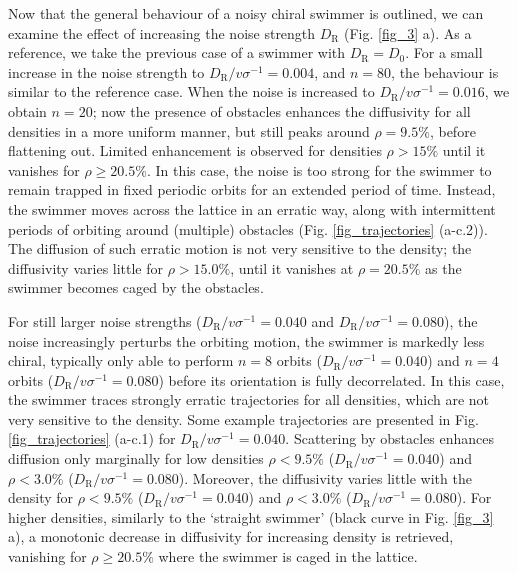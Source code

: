 \documentclass[aps,pre,twocolumn,showpacs,superscriptaddress,amsmath,amssymb,longbibliography]{revtex4-2}
\begin{document}
Now that the general behaviour of a noisy chiral swimmer is outlined, we can examine the effect of increasing the noise strength $D_{\textrm{R}}$ (Fig. \ref{fig_3} a). As a reference, we take the previous case of a swimmer with $D_{\textrm{R}}=D_{\textrm{0}}$. For a small increase in the noise strength to $D_{\textrm{R}}/v\sigma^{-1}=0.004$, and $n=80$, the behaviour is similar to the reference case. When the noise is increased to $D_{\textrm{R}}/v\sigma^{-1}=0.016$, we obtain $n=20$; now the presence of obstacles enhances the diffusivity for all densities in a more uniform manner, but still peaks around $\rho = 9.5 \%$, before flattening out. Limited enhancement is observed for densities  $\rho > 15 \%$ until it vanishes for $\rho \geq 20.5 \%$. In this case, the noise is too strong for the swimmer to remain trapped in fixed periodic orbits for an extended period of time. Instead, the swimmer moves across the lattice in an erratic way, along with intermittent periods of orbiting around (multiple) obstacles (Fig. \ref{fig_trajectories} (a-c.2)). The diffusion of such erratic motion is not very sensitive to the density; the diffusivity varies little for $\rho > 15.0 \%$, until it vanishes at $\rho = 20.5 \%$ as the swimmer becomes caged by the obstacles. 

For still larger noise strengths ($D_{\textrm{R}}/v\sigma^{-1}=0.040$ and $D_{\textrm{R}}/v\sigma^{-1}=0.080$), the noise increasingly perturbs the orbiting motion, the swimmer is markedly less chiral, typically only able to perform $n=8$ orbits ($D_{\textrm{R}}/v\sigma^{-1}=0.040$) and $n=4$ orbits ($D_{\textrm{R}}/v\sigma^{-1}=0.080$) before its orientation is fully decorrelated. In this case, the swimmer traces strongly erratic trajectories for all densities, which are not very sensitive to the density. Some example trajectories are presented in Fig. \ref{fig_trajectories} (a-c.1) for $D_{\textrm{R}}/v\sigma^{-1}=0.040$. Scattering by obstacles enhances diffusion only marginally for low densities $\rho < 9.5 \%$ ($D_{\textrm{R}}/v\sigma^{-1}=0.040$) and $\rho < 3.0 \%$ ($D_{\textrm{R}}/v\sigma^{-1}=0.080$).  Moreover, the diffusivity varies little with the density for $\rho < 9.5 \%$ ($D_{\textrm{R}}/v\sigma^{-1}=0.040$) and $\rho < 3.0 \%$ ($D_{\textrm{R}}/v\sigma^{-1}=0.080$). For higher densities, similarly to the `straight swimmer' (black curve in Fig. \ref{fig_3} a), a monotonic decrease in diffusivity for increasing density is retrieved, vanishing for $\rho \geq 20.5 \%$ where the swimmer is caged in the lattice.
\end{document}
